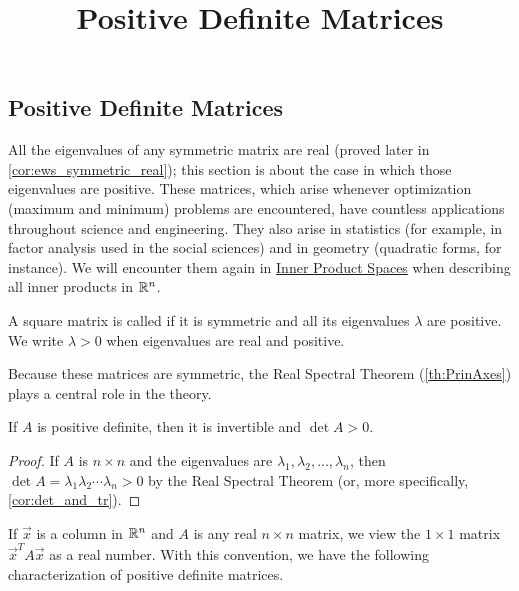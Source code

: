 \documentclass{ximera}
\title{Positive Definite Matrices} \license{CC BY-NC-SA 4.0}
\begin{document}
\begin{abstract}

\end{abstract}
\maketitle

\begin{onlineOnly}
\section*{Positive Definite Matrices}
\end{onlineOnly}

All the eigenvalues of any symmetric
matrix are real (proved later in \ref{cor:ews_symmetric_real}); this section is about the case in which those eigenvalues
 are positive. These matrices, which arise whenever optimization
(maximum and minimum) problems are encountered, have countless
applications throughout science and engineering. They also arise in
statistics (for example, in factor analysis used in the social sciences)
 and in geometry (quadratic forms, for instance). We will encounter them again in \href{https://ximera.osu.edu/linearalgebradzv3/LinearAlgebraInteractiveIntro/VSP-0070/main}{Inner Product Spaces} when describing all inner products in $\mathbb{R}^n$.


\begin{definition}\label{def:024811}
A square matrix is called  if it is symmetric and all its eigenvalues $\lambda$ are positive.  We write $\lambda>0$ when eigenvalues are real and positive.
\end{definition}

Because these matrices are symmetric, the Real Spectral Theorem (\ref{th:PrinAxes}) plays a central role in the theory.


\begin{theorem}\label{thm:024815}
If $A$ is positive definite, then it is invertible and $\det A > 0$.
\end{theorem}

\begin{proof}
If $A$ is $n \times n$ and the eigenvalues are $\lambda_{1}, \lambda_{2}, \dots, \lambda_{n}$, then $\det A = \lambda_{1}\lambda_{2} \cdots \lambda_{n} > 0$ by the Real Spectral Theorem (or, more specifically, \ref{cor:det_and_tr}).
\end{proof}

If $\vec{x}$ is a column in $\mathbb{R}^n$ and $A$ is any real $n \times n$ matrix, we view the $1 \times 1$ matrix $\vec{x}^{T}A\vec{x}$ as a real number. With this convention, we have the following characterization of positive definite matrices.
\end{document}
